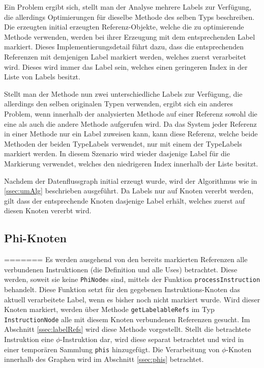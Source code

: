 Ein Problem ergibt sich, stellt man der Analyse mehrere Labels zur Verfügung, die allerdings
Optimierungen für dieselbe Methode des selben Typs beschreiben. Die erzeugten initial erzeugten 
Referenz-Objekte, welche die zu optimierende Methode verwenden, werden bei ihrer Erzeugung
mit dem entsprechenden Label markiert. Dieses Implementierungsdetail führt dazu, dass 
die entsprechenden Referenzen mit demjenigen Label markiert werden, welches zuerst verarbeitet wird.
Dieses wird immer das Label sein, welches einen geringeren Index in der Liste von Labels 
besitzt. 

Stellt man der Methode nun zwei unterschiedliche Labels zur Verfügung, die allerdings den
selben originalen Typen verwenden, ergibt sich ein anderes Problem, wenn innerhalb der analysierten 
Methode auf einer Referenz sowohl die eine als auch die andere Methode aufgerufen wird. Da das 
System jeder Referenz in einer Methode nur ein Label zuweisen kann, kann diese Referenz, welche 
beide Methoden der beiden TypeLabels verwendet, nur mit einem der TypeLabels markiert werden. 
In diesem Szenario wird wieder dasjenige Label für die Markierung verwendet, welches den niedrigeren
Index innerhalb der Liste besitzt.

Nachdem der Datenflussgraph initial erzeugt wurde, wird der Algorithmus wie in \ref{ssec:umAlg} 
beschrieben ausgeführt. Da Labels nur auf Knoten vererbt werden, gilt dass der entsprechende
Knoten dasjenige Label erhält, welches zuerst auf diesen Knoten vererbt wird.  

\subsection{Phi-Knoten}
=======
Es werden ausgehend von den bereits markierten Referenzen alle verbundenen Instruktionen
(die Definition und alle Uses) betrachtet. Diese werden, soweit sie keine \texttt{PhiNode}s
sind, mittels der Funktion \texttt{processInstruction} behandelt. Diese Funktion setzt
für den gegebenen Instruktions-Knoten das aktuell verarbeitete Label, wenn es bisher 
noch nicht markiert wurde. Wird dieser Knoten markiert, werden über Methode 
\texttt{getLabelableRefs} im Typ \texttt{InstructionNode} alle mit diesem Knoten 
verbundenen Referenzen gesucht. Im Abschnitt \ref{ssec:labelRefs} wird diese Methode 
vorgestellt. Stellt die betrachtete Instruktion eine $\phi$-Instruktion dar, wird 
diese separat betrachtet und wird in einer temporären Sammlung \texttt{phis} hinzugefügt.
Die Verarbeitung von $\phi$-Knoten innerhalb des Graphen wird im Abschnitt \ref{ssec:phis}
betrachtet.

